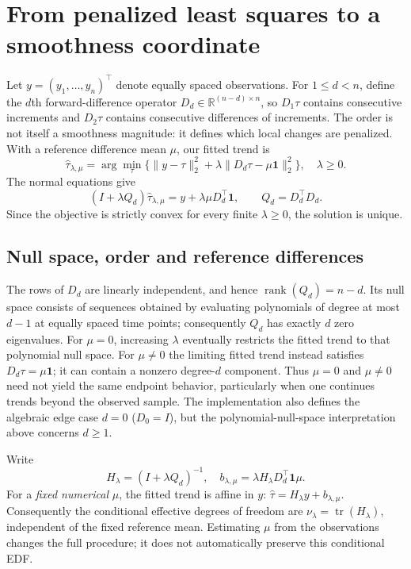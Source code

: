 \section{From penalized least squares to a smoothness coordinate}
\label{sec:expanded-theory}
Let $y=(y_1,\dots,y_n)^\top$ denote equally spaced observations.
For $1\leq d<n$, define the $d$th forward-difference operator
$D_d\in\mathbb R^{(n-d)\times n}$, so $D_1\tau$ contains consecutive
increments and $D_2\tau$ contains consecutive differences of increments.
The order is not itself a smoothness magnitude: it defines which
local changes are penalized. With a reference difference mean
$\mu$, our fitted trend is
\begin{equation}
\widehat{\tau}_{\lambda,\mu}
=\arg\min_\tau\bigl\{\|y-\tau\|_2^2+
  \lambda\|D_d\tau-\mu\mathbf1\|_2^2\bigr\},\quad
  \lambda\ge0 .
\label{eq:expanded-pls}
\end{equation}
The normal equations give
\begin{equation}
(I+\lambda Q_d)\widehat\tau_{\lambda,\mu}
=y+\lambda\mu D_d^\top\mathbf1,\qquad Q_d=D_d^\top D_d.
\label{eq:expanded-normal}
\end{equation}
Since the objective is strictly convex for every finite
$\lambda\ge0$, the solution is unique.

\subsection{Null space, order and reference differences}
The rows of $D_d$ are linearly independent, and hence
$\operatorname{rank}(Q_d)=n-d$. Its null space consists of sequences
obtained by evaluating polynomials of degree at most $d-1$ at
equally spaced time points; consequently $Q_d$ has exactly
$d$ zero eigenvalues. For $\mu=0$, increasing $\lambda$
eventually restricts the fitted trend to that polynomial null space.
For $\mu\ne0$ the limiting fitted trend instead satisfies
$D_d\tau=\mu\mathbf1$; it can contain a nonzero degree-$d$ component.
Thus $\mu=0$ and $\mu\ne0$ need not yield the same endpoint
behavior, particularly when one continues trends beyond the
observed sample. The implementation also defines the algebraic
edge case $d=0$ ($D_0=I$), but the polynomial-null-space
interpretation above concerns $d\ge1$.

Write
\[
  H_\lambda=(I+\lambda Q_d)^{-1},\quad
  b_{\lambda,\mu}=\lambda H_\lambda D_d^\top\mathbf1\mu.
\]
For a \emph{fixed numerical} $\mu$, the fitted trend is affine in
$y$: $\widehat\tau=H_\lambda y+b_{\lambda,\mu}$.
Consequently the conditional effective degrees of freedom are
$\nu_\lambda=\operatorname{tr}(H_\lambda)$, independent of the
fixed reference mean. Estimating $\mu$ from the observations
changes the full procedure; it does not automatically preserve
this conditional EDF.

